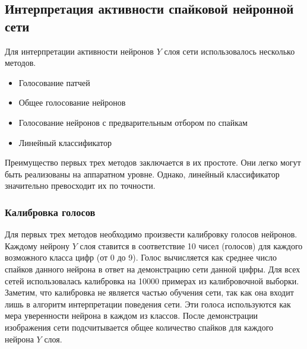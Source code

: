 \documentclass[a4paper]{article}
\begin{document}
{\subsection{Интерпретация активности спайковой нейронной сети}

Для интерпретации активности нейронов $Y$ слоя сети использовалось несколько методов.

\begin{itemize}
 \item Голосование патчей
 \item Общее голосование нейронов
 \item Голосование нейронов с предварительным отбором по спайкам
 \item Линейный классификатор
\end{itemize}

Преимущество первых трех методов заключается в их простоте. Они легко могут быть реализованы на аппаратном уровне. Однако, линейный классификатор значительно превосходит их по точности.\\

\subsubsection{Калибровка голосов}} \label{calibration}
Для первых трех методов необходимо произвести калибровку голосов нейронов. Каждому нейрону $Y$ слоя ставится в соответствие 10 чисел (голосов) для каждого возможного класса цифр (от 0 до 9). Голос вычисляется как среднее число спайков данного нейрона в ответ на демонстрацию сети данной цифры. Для всех сетей использовалась калибровка на 10000 примерах из калибровочной выборки. Заметим, что калибровка не является частью обучения сети, так как она входит лишь в алгоритм интерпретации поведения сети. Эти голоса используются как мера уверенности нейрона в каждом из классов. После демонстрации изображения сети подсчитывается общее количество спайков для каждого нейрона $Y$ слоя.
\end{document}
